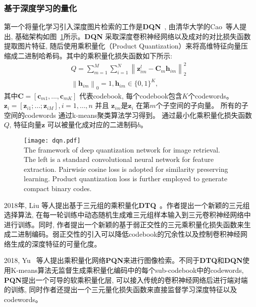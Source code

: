 \subsubsection{基于深度学习的量化}
第一个将量化学习引入深度图片检索的工作是\textbf{DQN}~\cite{yue2016deep}, 由清华大学的Cao~等人提出, 基础架构如图~\ref{fig:dqn}所示。\textbf{DQN} 采取深度卷积神经网络以及成对的对比损失函数提取图片特征, 随后使用乘积量化（Product Quantization）来将高维特征向量压缩成二进制哈希码。其中的乘积量化损失函数如下所示:
\begin{equation}
    \begin{gathered}
        Q=\sum_{m=1}^M \sum_{i=1}^N\left\|\boldsymbol{z}_{i m}^l-\boldsymbol{C}_m \boldsymbol{h}_{i m}\right\|_2^2 \\
        \left\|\boldsymbol{h}_{i m}\right\|_0=1, \boldsymbol{h}_{i m} \in\{0,1\}^K,
        \end{gathered}
    \label{eq:pqloss}
\end{equation}
其中$\mathbf{C}=\left[\mathbf{c}_{m 1}, \ldots, \mathbf{c}_{m K}\right]$ 代表codebook, 每个codebook包含$K$个codewords。 $\mathbf{z}_i=\left[\mathbf{z}_{i 1} ; \ldots ; \mathbf{z}_{i M}\right], i=1, \ldots, n$ 并且 $\mathbf{z}_{im}$是$\mathbf{z}_i$ 在第$m$个子空间的子向量。 所有的子空间的codewords 通过k-means聚类算法学习得到。 通过最小化乘积量化损失函数$Q$, 特征向量$\mathbf{z}$ 可以被量化成对应的二进制码$b$。\par
\begin{figure}[!htp]
    \centering
    \texttt{[image: dqn.pdf]} \\
      {The framework of deep quantization network for image retrieval. The left is a standard convolutional neural network for feature extraction. Pairwisie cosine loss is adopted for similarity preserving learning. Product quantization loss is further employed to generate compact binary codes.}
   \label{fig:dqn}
\end{figure}
2018年, Liu 等人提出基于三元组的乘积量化\textbf{DTQ}~\cite{liu2018deep}。作者提出一个新颖的三元组选择算法, 在每一轮训练中动态随机生成难三元组样本输入到三元卷积神经网络中进行训练。同时, 作者提出一个新颖的基于弱正交性的三元乘积量化损失函数来生成二进制编码。弱正交性的引入可以降低codebook的冗余性以及控制卷积神经网络生成的深度特征的可量化度。\par
2018, Yu ~\cite{yu2018product}等人提出乘积量化网络\textbf{PQN}来进行图像检索。不同于\textbf{DTQ}和\textbf{DQN}使用K-means算法无监督生成乘积量化编码中的每个sub-codebook中的codewords, \textbf{PQN}提出一个可导的软乘积量化层, 可以接入传统的卷积神经网络后进行端对端的训练, 同时作者还提出一个三元量化损失函数来直接监督学习深度特征以及codewords。\par
